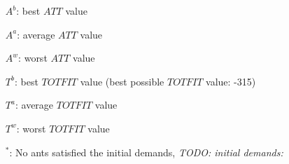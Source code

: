 \begin{sidewaystable}
    \begin{itemize}[noitemsep]
    \item[$A^b$:] best $ATT$ value
    \item[$A^a$:] average $ATT$ value
    \item[$A^w$:] worst $ATT$ value
    \item[$T^b$:] best $TOTFIT$ value (best possible $TOTFIT$ value: -315)
    \item[$T^a$:] average $TOTFIT$ value
    \item[$T^w$:] worst $TOTFIT$ value
    \item[$^*$:] No ants satisfied the initial demands, \emph{\color{blue} TODO: initial demands: }
    \end{itemize}
    \label{table:pm2}
\end{sidewaystable}

